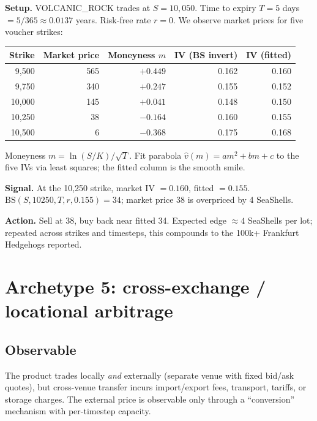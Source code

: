 \begin{prosperitybox}[title={IV scalping walk-through}]
\textbf{Setup.}  VOLCANIC\_ROCK trades at $S = 10{,}050$.  Time to
expiry $T = 5$ days $= 5/365 \approx 0.0137$ years.  Risk-free rate
$r = 0$.  We observe market prices for five voucher strikes:

\medskip
\begin{tabular}{rrrrr}
\toprule
\textbf{Strike} & \textbf{Market price} & \textbf{Moneyness $m$} &
\textbf{IV (BS invert)} & \textbf{IV (fitted)} \\
\midrule
9{,}500  & 565 & $+0.449$ & 0.162 & 0.160 \\
9{,}750  & 340 & $+0.247$ & 0.155 & 0.152 \\
10{,}000 & 145 & $+0.041$ & 0.148 & 0.150 \\
10{,}250 &  38 & $-0.164$ & 0.160 & 0.155 \\
10{,}500 &   6 & $-0.368$ & 0.175 & 0.168 \\
\bottomrule
\end{tabular}
\medskip

Moneyness $m = \ln(S/K) / \sqrt{T}$.  Fit parabola $\hat{v}(m) = am^2
+ bm + c$ to the five IVs via least squares; the fitted column is
the smooth smile.

\textbf{Signal.}  At the 10{,}250 strike, market IV $= 0.160$,
fitted $= 0.155$.  $\text{BS}(S, 10250, T, r, 0.155) = 34$; market
price 38 is overpriced by 4 SeaShells.

\textbf{Action.}  Sell at 38, buy back near fitted 34.  Expected
edge $\approx 4$ SeaShells per lot; repeated across strikes and
timesteps, this compounds to the 100k+ Frankfurt Hedgehogs reported.
\end{prosperitybox}

\section{Archetype 5: cross-exchange / locational arbitrage}
\label{sec:archetype_location}

\subsection{Observable}

The product trades locally \emph{and} externally (separate venue
with fixed bid/ask quotes), but cross-venue transfer incurs
import/export fees, transport, tariffs, or storage charges.  The
external price is observable only through a ``conversion'' mechanism
with per-timestep capacity.


